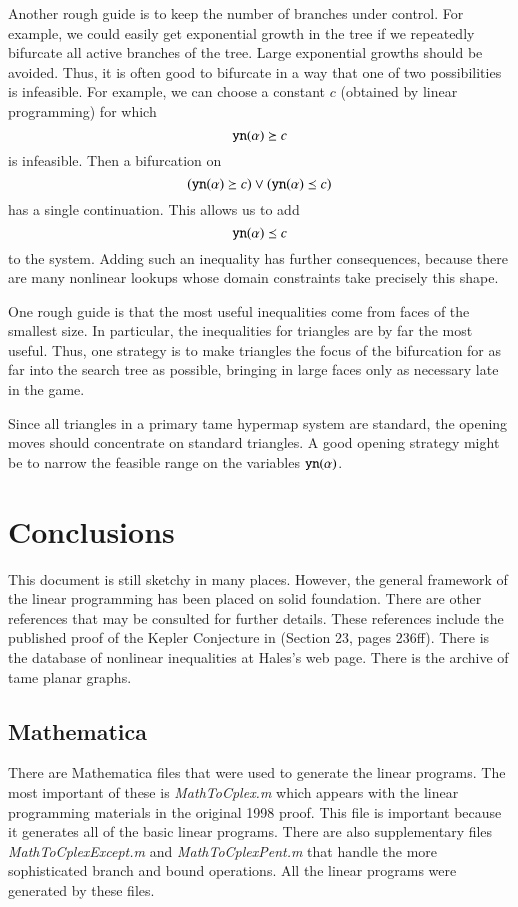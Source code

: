 Another rough guide is to keep the number of branches under
control.  For example, we could easily get exponential growth in
the tree if we repeatedly bifurcate all active branches of the
tree.  Large exponential growths should be avoided.  Thus, it is
often good to bifurcate in a way that one of two possibilities is
infeasible.  For example, we can choose a constant $c$ (obtained
by linear programming) for which
    $${\operatorname{{\texttt{yn}}}}(\alpha)\succeq c$$ is infeasible.  Then a bifurcation
    on
$$({\operatorname{{\texttt{yn}}}}(\alpha) \succeq c) \vee ({\operatorname{{\texttt{yn}}}}(\alpha) \preceq c)$$
has a single continuation.  This allows us to add
    $${\operatorname{{\texttt{yn}}}}(\alpha)\preceq c$$
to the system.  Adding such an inequality has further
consequences, because there are many nonlinear lookups whose
domain constraints take precisely this shape.

One rough guide is that the most useful inequalities come from
faces of the smallest size.  In particular, the inequalities for
triangles are by far the most useful.  Thus, one strategy is to
make triangles the focus of the bifurcation for as far into the
search tree as possible, bringing in large faces only as necessary
late in the game.

Since all triangles in a primary tame hypermap system are
standard, the opening moves should concentrate on standard
triangles.  A good opening strategy might be to narrow the
feasible range on the variables ${\operatorname{{\texttt{yn}}}}(\alpha)$.

\section{Conclusions}

This document is still sketchy in many places.  However, the
general framework of the linear programming has been placed on
solid foundation.  There are other references that may be
consulted for further details.  These references include the
published proof of the Kepler Conjecture in \cite{DCG} (Section
23, pages 236ff). There is the database of nonlinear inequalities
at Hales's web page. There is the archive of tame planar graphs.

\subsection{Mathematica}

There are Mathematica files that were used to generate the linear
programs.  The most important of these is {\it MathToCplex.m}
which appears with the linear programming materials in the
original 1998 proof.  This file is important because it generates
all of the basic linear programs.  There are also supplementary
files {\it MathToCplexExcept.m} and {\it MathToCplexPent.m} that
handle the more sophisticated branch and bound operations.  All
the linear programs were generated by these files.

